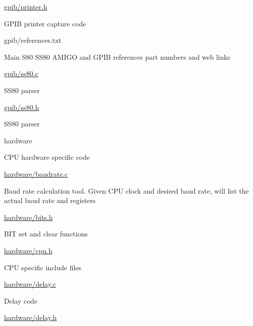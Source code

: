 \begin{DoxyPre}
\begin{DoxyItemize}
\begin{DoxyItemize}
\begin{DoxyItemize}
\end{DoxyItemize}
\item \hyperlink{printer_8h}{gpib/printer.h}
\begin{DoxyItemize}
\item GPIB printer capture code
\end{DoxyItemize}
\item gpib/references.txt
\begin{DoxyItemize}
\item Main S80 SS80 AMIGO and GPIB references part numbers and web links
\end{DoxyItemize}
\item \hyperlink{ss80_8c}{gpib/ss80.c}
\begin{DoxyItemize}
\item SS80 parser
\end{DoxyItemize}
\item \hyperlink{ss80_8h}{gpib/ss80.h}
\begin{DoxyItemize}
\item SS80 parser
\end{DoxyItemize}
\end{DoxyItemize}
\item hardware
\begin{DoxyItemize}
\item CPU hardware specific code
\item \hyperlink{baudrate_8c}{hardware/baudrate.c}
\begin{DoxyItemize}
\item Baud rate calculation tool. Given CPU clock and desired baud rate, will list the actual baud rate and registers
\end{DoxyItemize}
\item \hyperlink{bits_8h}{hardware/bits.h}
\begin{DoxyItemize}
\item BIT set and clear functions
\end{DoxyItemize}
\item \hyperlink{cpu_8h}{hardware/cpu.h}
\begin{DoxyItemize}
\item CPU specific include files
\end{DoxyItemize}
\item \hyperlink{delay_8c}{hardware/delay.c}
\begin{DoxyItemize}
\item Delay code
\end{DoxyItemize}
\item \hyperlink{delay_8h}{hardware/delay.h}

\end{DoxyItemize}
\end{DoxyItemize}
\end{DoxyPre}
